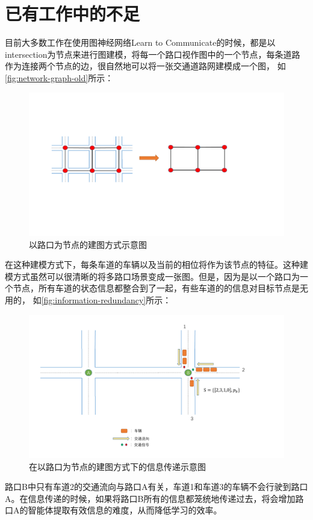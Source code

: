 \section{已有工作中的不足}
目前大多数工作在使用图神经网络Learn to Communicate的时候，都是以intersection为节点来进行图建模，将每一个路口视作图中的一个节点，每条道路作为连接两个节点的边，很自然地可以将一张交通道路网建模成一个图， 如\autoref{fig:network-graph-old}所示：
\begin{figure}[htb]
  \includegraphics[width=1.2\textwidth]{ppt/network-graph.pdf}
  \caption{以路口为节点的建图方式示意图}
  \label{fig:network-graph-old}
\end{figure}
在这种建模方式下，每条车道的车辆以及当前的相位将作为该节点的特征。这种建模方式虽然可以很清晰的将多路口场景变成一张图。但是，因为是以一个路口为一个节点，所有车道的状态信息都整合到了一起，有些车道的的信息对目标节点是无用的，
如\autoref{fig:information-redundancy}所示：
\begin{figure}[htb]
  \includegraphics[width=1.2\textwidth]{ppt/information-redundancy.pdf}
  \caption{在以路口为节点的建图方式下的信息传递示意图}
  \label{fig:information-redundancy}
\end{figure}
路口B中只有车道2的交通流向与路口A有关，车道1和车道3的车辆不会行驶到路口A。在信息传递的时候，如果将路口B所有的信息都笼统地传递过去，将会增加路口A的智能体提取有效信息的难度，从而降低学习的效率。

